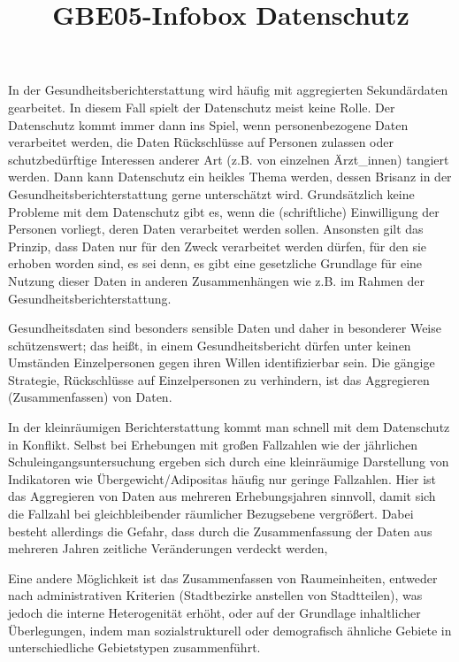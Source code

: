 \documentclass{article}
\begin{document}
\title{GBE05-Infobox Datenschutz}

\maketitle








In der Gesundheitsberichterstattung wird häufig mit aggregierten Sekundärdaten gearbeitet. In diesem Fall spielt der Datenschutz meist keine Rolle. Der Datenschutz kommt immer dann ins Spiel, wenn personenbezogene Daten verarbeitet werden, die Daten Rückschlüsse auf Personen zulassen oder schutzbedürftige Interessen anderer Art (z.B. von einzelnen Ärzt\_innen) tangiert werden. Dann kann Datenschutz ein heikles Thema werden, dessen Brisanz in der Gesundheitsberichterstattung gerne unterschätzt wird. Grundsätzlich keine Probleme mit dem Datenschutz gibt es, wenn die (schriftliche) Einwilligung der Personen vorliegt, deren Daten verarbeitet werden sollen. Ansonsten gilt das Prinzip, dass Daten nur für den Zweck verarbeitet werden dürfen, für den sie erhoben worden sind, es sei denn, es gibt eine gesetzliche Grundlage für eine Nutzung dieser Daten in anderen Zusammenhängen wie z.B. im Rahmen der Gesundheitsberichterstattung.


Gesundheitsdaten sind besonders sensible Daten und daher in besonderer Weise schützenswert; das heißt, in einem Gesundheitsbericht dürfen unter keinen Umständen Einzelpersonen gegen ihren Willen identifizierbar sein. Die gängige Strategie, Rückschlüsse auf Einzelpersonen zu verhindern, ist das Aggregieren (Zusammenfassen) von Daten. 


In der kleinräumigen Berichterstattung kommt man schnell mit dem Datenschutz in Konflikt. Selbst bei Erhebungen mit großen Fallzahlen wie der jährlichen Schuleingangsuntersuchung ergeben sich durch eine kleinräumige Darstellung von Indikatoren wie Übergewicht/Adipositas häufig nur geringe Fallzahlen. Hier  ist das Aggregieren von Daten aus mehreren Erhebungsjahren sinnvoll, damit sich die Fallzahl bei gleichbleibender räumlicher Bezugsebene vergrößert. Dabei besteht allerdings die Gefahr, dass durch die Zusammenfassung der Daten aus mehreren Jahren zeitliche Veränderungen verdeckt werden, 


Eine andere Möglichkeit ist das Zusammenfassen von Raumeinheiten, entweder nach administrativen Kriterien (Stadtbezirke anstellen von Stadtteilen), was jedoch die interne Heterogenität erhöht, oder auf der Grundlage inhaltlicher Überlegungen, indem man sozialstrukturell oder demografisch ähnliche Gebiete in unterschiedliche Gebietstypen zusammenführt.
\end{document}
